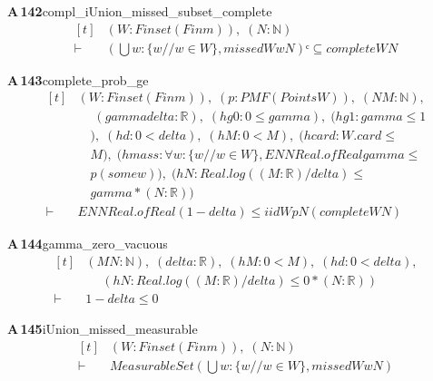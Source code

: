 \documentclass[conference]{IEEEtran}
\theoremstyle{definition}
\newcommand{\lean}[1]{\textsf{\footnotesize #1}}
\begin{document}
\noindent\textbf{A\,142}\quad\lean{compl\_iUnion\_missed\_subset\_complete}
{\footnotesize\[ \begin{aligned}[t]
&(\mathit{W} : \mathit{Finset} (\mathit{Fin} \mathit{m})),\; (\mathit{N} : \mathbb{N} )\\
\vdash\;&(⋃ \mathit{w} : \{ \mathit{w} // \mathit{w} \in \mathit{W}\} , \mathit{missed} \mathit{W} \mathit{w} \mathit{N})ᶜ \subseteq \mathit{complete} \mathit{W} \mathit{N}
\end{aligned} \]}

\noindent\textbf{A\,143}\quad\lean{complete\_prob\_ge}
{\footnotesize\[ \begin{aligned}[t]
&(\mathit{W} : \mathit{Finset} (\mathit{Fin} \mathit{m})),\; (\mathit{p} : \mathit{PMF} (\mathit{Points} \mathit{W})),\; (\mathit{N} \mathit{M} : \mathbb{N} ),\\
&\quad \; (\mathit{gamma} \mathit{delta} : \mathbb{R} ),\; (\mathit{hg0} : 0 \leq \mathit{gamma}),\; (\mathit{hg1} : \mathit{gamma} \leq 1\\
&\quad ),\; (\mathit{hd} : 0 < \mathit{delta}),\; (\mathit{hM} : 0 < \mathit{M}),\; (\mathit{hcard} : \mathit{W}.\mathit{card} \leq\\
&\quad \mathit{M}),\; (\mathit{hmass} : \forall \mathit{w} : \{ \mathit{w} // \mathit{w} \in \mathit{W}\} , \mathit{ENNReal}.\mathit{ofReal} \mathit{gamma} \leq\\
&\quad \mathit{p} (\mathit{some} \mathit{w})),\; (\mathit{hN} : \mathit{Real}.\mathit{log} ((\mathit{M}:\mathbb{R} )/\mathit{delta}) \leq\\
&\quad \mathit{gamma}*(\mathit{N}:\mathbb{R} ))\\
\vdash\;&\mathit{ENNReal}.\mathit{ofReal} (1-\mathit{delta}) \leq \mathit{iid} \mathit{W} \mathit{p} \mathit{N} (\mathit{complete} \mathit{W} \mathit{N})
\end{aligned} \]}

\noindent\textbf{A\,144}\quad\lean{gamma\_zero\_vacuous}
{\footnotesize\[ \begin{aligned}[t]
&(\mathit{M} \mathit{N} : \mathbb{N} ),\; (\mathit{delta} : \mathbb{R} ),\; (\mathit{hM} : 0 < \mathit{M}),\; (\mathit{hd} : 0 < \mathit{delta}),\\
&\quad \; (\mathit{hN} : \mathit{Real}.\mathit{log} ((\mathit{M}:\mathbb{R} )/\mathit{delta}) \leq 0*(\mathit{N}:\mathbb{R} ))\\
\vdash\;&1 - \mathit{delta} \leq 0
\end{aligned} \]}

\noindent\textbf{A\,145}\quad\lean{iUnion\_missed\_measurable}
{\footnotesize\[ \begin{aligned}[t]
&(\mathit{W} : \mathit{Finset} (\mathit{Fin} \mathit{m})),\; (\mathit{N} : \mathbb{N} )\\
\vdash\;&\mathit{MeasurableSet} (⋃ \mathit{w} : \{ \mathit{w} // \mathit{w} \in \mathit{W}\} , \mathit{missed} \mathit{W} \mathit{w} \mathit{N})
\end{aligned} \]}
\end{document}
